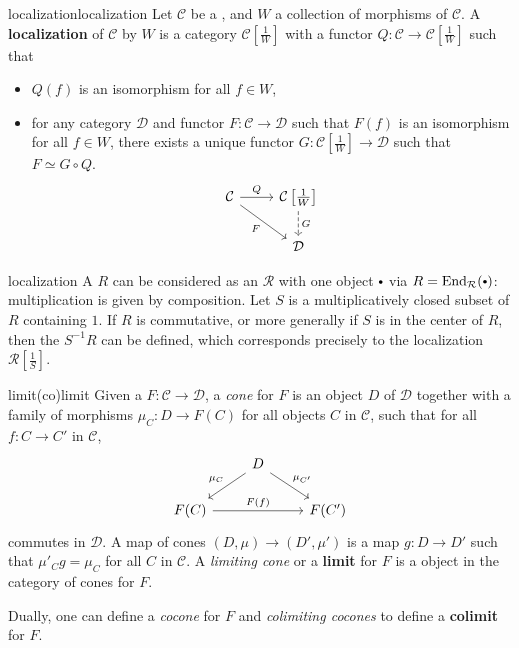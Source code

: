 \begin{topic}{localization}{localization}
    Let $\mathcal{C}$ be a , and $W$ a collection of morphisms of $\mathcal{C}$. A \textbf{localization} of $\mathcal{C}$ by $W$ is a category $\mathcal{C}\left[\frac{1}{W}\right]$ with a functor $Q : \mathcal{C} \to \mathcal{C}\left[\frac{1}{W}\right]$ such that
    \begin{itemize}
        \item $Q(f)$ is an isomorphism for all $f \in W$,
        \item for any category $\mathcal{D}$ and functor $F : \mathcal{C} \to \mathcal{D}$ such that $F(f)$ is an isomorphism for all $f \in W$, there exists a unique functor $G : \mathcal{C}\left[\frac{1}{W}\right] \to \mathcal{D}$ such that $F \simeq G \circ Q$.
        \[ \begin{tikzcd} \mathcal{C} \arrow{r}{Q} \arrow[swap]{rd}{F} & \mathcal{C}\left[\frac{1}{W}\right] \arrow[dashed]{d}{G} \\ & \mathcal{D} \end{tikzcd} \]
    \end{itemize}
\end{topic}

\begin{example}{localization}
    A  $R$ can be considered as an  $\mathcal{R}$ with one object $\bdot$ via $R = \textup{End}_\mathcal{R}(\bdot)$: multiplication is given by composition. Let $S$ is a multiplicatively closed subset of $R$ containing $1$. If $R$ is commutative, or more generally if $S$ is in the center of $R$, then the  $S^{-1} R$ can be defined, which corresponds precisely to the localization $\mathcal{R}\left[\frac{1}{S}\right]$.
\end{example}

\begin{topic}{limit}{(co)limit}
    Given a  $F : \mathcal{C} \to \mathcal{D}$, a \textit{cone} for $F$ is an object $D$ of $\mathcal{D}$ together with a family of morphisms $\mu_C : D \to F(C)$ for all objects $C$ in $\mathcal{C}$, such that for all $f : C \to C'$ in $\mathcal{C}$,
    \[ \begin{tikzcd} & D \arrow[swap]{ld}{\mu_C} \arrow{rd}{\mu_{C'}} & \\ F(C) \arrow{rr}{F(f)} && F(C') \end{tikzcd} \]
    commutes in $\mathcal{D}$. A map of cones $(D, \mu) \to (D', \mu')$ is a map $g : D \to D'$ such that $\mu'_C g = \mu_C$ for all $C$ in $\mathcal{C}$. A \textit{limiting cone} or a \textbf{limit} for $F$ is a  object in the category of cones for $F$.
    
    Dually, one can define a \textit{cocone} for $F$ and \textit{colimiting cocones} to define a \textbf{colimit} for $F$.
\end{topic}

